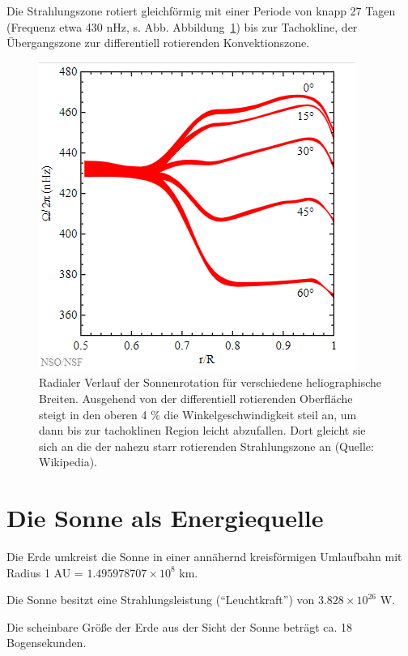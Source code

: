 \documentclass[
  a4paper,
  DIV=11]{scrreprt}
\begin{document}
Die Strahlungszone rotiert gleichförmig mit einer Periode von knapp 27
Tagen (Frequenz etwa 430 nHz, s. Abb. Abbildung~\ref{fig-diffrot}) bis
zur Tachokline, der Übergangszone zur differentiell rotierenden
Konvektionszone.

\begin{figure}

{\centering \includegraphics{./images/paste-A039882F.png}

}

\caption{\label{fig-diffrot}Radialer Verlauf der Sonnenrotation für
verschiedene heliographische Breiten. Ausgehend von der differentiell
rotierenden Oberfläche steigt in den oberen 4 \% die
Winkelgeschwindigkeit steil an, um dann bis zur tachoklinen Region
leicht abzufallen. Dort gleicht sie sich an die der nahezu starr
rotierenden Strahlungszone an (Quelle: Wikipedia).}

\end{figure}

\hypertarget{die-sonne-als-energiequelle}{%
\chapter{Die Sonne als
Energiequelle}\label{die-sonne-als-energiequelle}}

Die Erde umkreist die Sonne in einer annähernd kreisförmigen Umlaufbahn
mit Radius 1 AU = \(1.495978707 \times 10^{8}\) km.

Die Sonne besitzt eine Strahlungsleistung (``Leuchtkraft'') von
\(3.828 \times 10^{26}\) W.

Die scheinbare Größe der Erde aus der Sicht der Sonne beträgt ca. 18
Bogensekunden.
\end{document}
